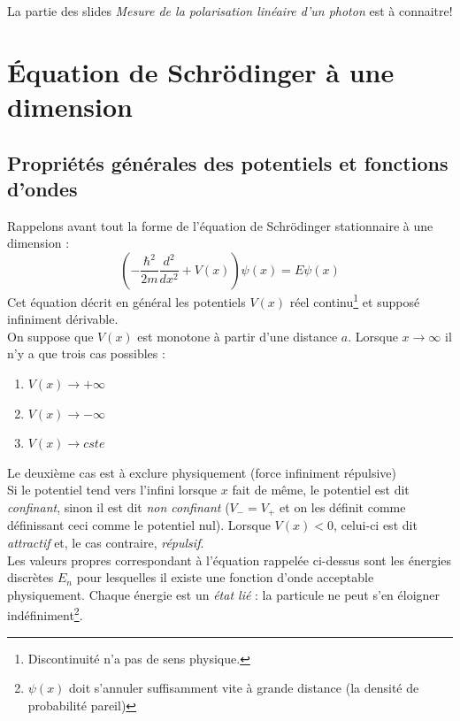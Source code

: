 \documentclass	[11pt, a4paper, openany]{book}
\begin{document}
La partie des slides \textit{Mesure de la polarisation linéaire d'un photon} est à connaitre! 




\chapter{Équation de Schrödinger à une dimension}
\section{Propriétés générales des potentiels et fonctions d'ondes}
\label{chap:5.1}
Rappelons avant tout la forme de l'équation de Schrödinger stationnaire à une dimension : 
\begin{equation}\label{eq:5.1}
\left(-\frac{\hbar^2}{2m}\frac{d^2}{dx^2} + V(x)\right)\psi(x) = E\psi(x)
\end{equation}
Cet équation décrit en général les potentiels $V(x)$ réel continu\footnote{Discontinuité n'a pas de sens physique.} et supposé infiniment dérivable.\\

On suppose que $V(x)$ est monotone à partir d'une distance $a$. Lorsque $x \rightarrow \infty$ il n'y a que trois cas possibles :
\begin{enumerate}
\item $V(x) \rightarrow +\infty$
\item $V(x) \rightarrow -\infty$
\item $V(x) \rightarrow cste$
\end{enumerate}
Le deuxième cas est à exclure physiquement (force infiniment répulsive)\\
Si le potentiel tend vers l'infini lorsque $x$ fait de même, le potentiel est dit \textit{confinant}, sinon il est dit \textit{non confinant} ($V_- =V_+$ et on les définit comme définissant ceci comme le potentiel nul). Lorsque $V(x) < 0$, celui-ci est dit \textit{attractif} et, le cas contraire, \textit{répulsif}.\\

Les valeurs propres correspondant à l'équation rappelée ci-dessus sont les énergies discrètes $E_n$ pour lesquelles il existe une fonction d'onde acceptable physiquement. Chaque énergie est un \textit{état lié} : la particule ne peut s'en éloigner indéfiniment\footnote{$\psi(x)$ doit s'annuler suffisamment vite à grande distance (la densité de probabilité pareil)}.
\end{document}
